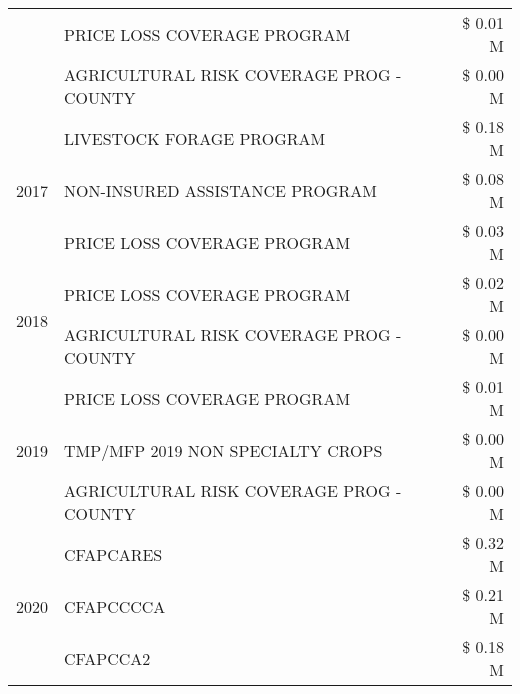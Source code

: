 \begin{tabular}{llr}
 & PRICE LOSS COVERAGE PROGRAM & \$ 0.01 M \\
 & AGRICULTURAL RISK COVERAGE PROG - COUNTY & \$ 0.00 M \\
\cline{1-3}
\multirow[t]{3}{*}{2017} & LIVESTOCK FORAGE PROGRAM & \$ 0.18 M \\
 & NON-INSURED ASSISTANCE PROGRAM & \$ 0.08 M \\
 & PRICE LOSS COVERAGE PROGRAM & \$ 0.03 M \\
\cline{1-3}
\multirow[t]{2}{*}{2018} & PRICE LOSS COVERAGE PROGRAM & \$ 0.02 M \\
 & AGRICULTURAL RISK COVERAGE PROG - COUNTY & \$ 0.00 M \\
\cline{1-3}
\multirow[t]{3}{*}{2019} & PRICE LOSS COVERAGE PROGRAM & \$ 0.01 M \\
 & TMP/MFP 2019 NON SPECIALTY CROPS & \$ 0.00 M \\
 & AGRICULTURAL RISK COVERAGE PROG - COUNTY & \$ 0.00 M \\
\cline{1-3}
\multirow[t]{3}{*}{2020} & CFAPCARES & \$ 0.32 M \\
 & CFAPCCCCA & \$ 0.21 M \\
 & CFAPCCA2 & \$ 0.18 M \\
\cline{1-3}
\bottomrule
\end{tabular}
